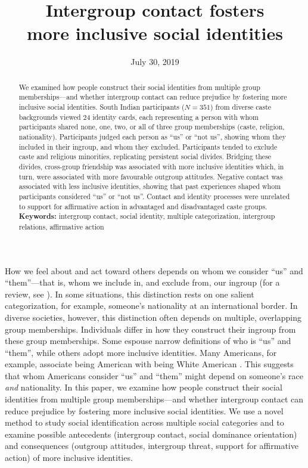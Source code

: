 \documentclass[12pt, a4paper]{article}
\title{Intergroup contact fosters\\more inclusive social identities}
\date{July 30, 2019}
\begin{document}
\maketitle

\begin{abstract}
\noindent We examined how people construct their social identities from multiple group memberships---and whether intergroup contact can reduce prejudice by fostering more inclusive social identities. South Indian participants ($N = 351$) from diverse caste backgrounds viewed 24 identity cards, each representing a person with whom participants shared none, one, two, or all of three group memberships (caste, religion, nationality). Participants judged each person as ``us'' or ``not us'', showing whom they included in their ingroup, and whom they excluded. Participants tended to exclude caste and religious minorities, replicating persistent social divides. Bridging these divides, cross-group friendship was associated with more inclusive identities which, in turn, were associated with more favourable outgroup attitudes. Negative contact was associated with less inclusive identities, showing that past experiences shaped whom participants considered ``us'' or ``not us''. Contact and identity processes were unrelated to support for affirmative action in advantaged and disadvantaged caste groups.\\[1ex]
\noindent \textbf{Keywords:} intergroup contact, social identity, multiple categorization, intergroup relations, affirmative action \\[1ex]
\end{abstract}


\noindent How we feel about and act toward others depends on whom we consider ``us'' and ``them''---that is, whom we include in, and exclude from, our ingroup (for a review, see ). In some situations, this distinction rests on one salient categorization, for example, someone's nationality at an international border. In diverse societies, however, this distinction often depends on multiple, overlapping group memberships. Individuals differ in how they construct their ingroup from these group memberships. Some espouse narrow definitions of who is ``us'' and ``them'', while others adopt more inclusive identities. Many Americans, for example, associate being American with being White American \cite{devos_american_2005}. This suggests that whom Americans consider ``us'' and ``them'' might depend on someone's race \emph{and} nationality. In this paper, we examine how people construct their social identities from multiple group memberships---and whether intergroup contact can reduce prejudice by fostering more inclusive social identities. We use a novel method to study social identification across multiple social categories and to examine possible antecedents (intergroup contact, social dominance orientation) and consequences (outgroup attitudes, intergroup threat, support for affirmative action) of more inclusive identities.
\end{document}
